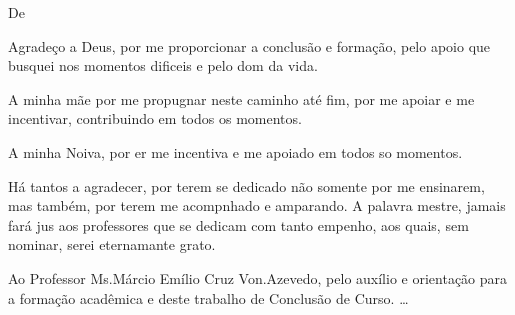 \begin{agradecimentos}

De \imprimirAutorUm
\newline
\par Agradeço a Deus, por me proporcionar a conclusão e formação, pelo apoio que
busquei nos momentos dificeis e pelo dom da vida.
\par A minha mãe por me propugnar neste caminho até fim, por me apoiar
e me incentivar, contribuindo em todos os momentos.
\par A minha Noiva, por er me incentiva e me apoiado em todos so
momentos.
\par Há tantos a agradecer, por terem se dedicado não somente por me ensinarem,
mas também, por terem me acompnhado e amparando. A palavra mestre, jamais fará
jus aos professores que se dedicam com tanto empenho, aos quais, sem nominar,
serei eternamante grato.
\par Ao Professor Ms.Márcio Emílio Cruz Von.Azevedo, 
pelo auxílio e orientação para a formação acadêmica e deste trabalho de Conclusão de Curso.
\ldots


\end{agradecimentos}




